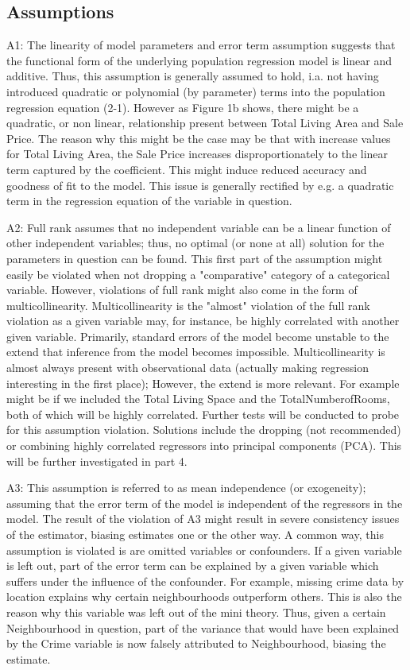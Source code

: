 \documentclass[a4paper]{article}
\begin{document}
\subsection{Assumptions}

\indent A1: The linearity of model parameters and error term assumption suggests that the functional form of the underlying population regression model is linear and additive. Thus, this assumption is generally assumed to hold, i.a. not having introduced quadratic or polynomial (by parameter) terms into the population regression equation (2-1). However as Figure 1b shows, there might be a quadratic, or non linear, relationship  present between Total Living Area and Sale Price. The reason why this might be the case may be that with increase values for Total Living Area, the Sale Price increases disproportionately to the linear term captured by the coefficient. This might induce reduced accuracy and goodness of fit to the model. This issue is generally rectified by e.g. a quadratic term in the regression equation of the variable in question.

\indent A2: Full rank assumes that no independent variable can be a linear function of other independent variables; thus, no optimal (or none at all) solution for the parameters in question can be found. This first part of the assumption might easily be violated when not dropping a "comparative" category of a categorical variable. However, violations of full rank might also come in the form of multicollinearity. Multicollinearity is the "almost" violation of the full rank violation as a given variable may, for instance, be highly correlated with another given variable. Primarily, standard errors of the model become unstable to the extend that inference from the model becomes impossible. Multicollinearity is almost always present with observational data (actually making regression interesting in the first place); However, the extend is more relevant. For example might be if we included the Total Living Space and the TotalNumberofRooms, both of which will be highly correlated. Further tests will be conducted to probe for this assumption violation. Solutions include the dropping (not recommended) or combining highly correlated regressors into principal components (PCA). This will be further investigated in part 4.

A3: This assumption is referred to as mean independence (or exogeneity); assuming that the error term of the model is independent of the regressors in the model. The result of the violation of A3 might result in severe consistency issues of the estimator, biasing estimates one or the other way.
A common way, this assumption is violated is are omitted variables or confounders. If a given variable is left out, part of the error term can be explained by a given variable which suffers under the influence of the confounder. For example, missing crime data by location explains why certain neighbourhoods outperform others. This is also the reason why this variable was left out of the mini theory. Thus, given a certain Neighbourhood in question, part of the variance that would have been explained by the Crime variable is now falsely attributed to Neighbourhood, biasing the estimate.
\end{document}
